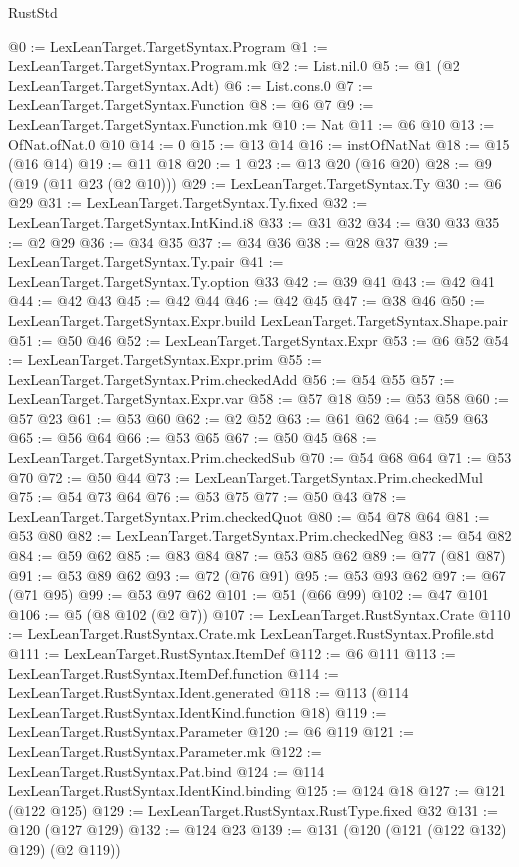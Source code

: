 \begin{lexlean}{RustStd}
\begin{coremodule}
@0 := LexLeanTarget.TargetSyntax.Program
@1 := LexLeanTarget.TargetSyntax.Program.mk
@2 := List.nil.{0}
@5 := @1 (@2 LexLeanTarget.TargetSyntax.Adt)
@6 := List.cons.{0}
@7 := LexLeanTarget.TargetSyntax.Function
@8 := @6 @7
@9 := LexLeanTarget.TargetSyntax.Function.mk
@10 := Nat
@11 := @6 @10
@13 := OfNat.ofNat.{0} @10
@14 := 0
@15 := @13 @14
@16 := instOfNatNat
@18 := @15 (@16 @14)
@19 := @11 @18
@20 := 1
@23 := @13 @20 (@16 @20)
@28 := @9 (@19 (@11 @23 (@2 @10)))
@29 := LexLeanTarget.TargetSyntax.Ty
@30 := @6 @29
@31 := LexLeanTarget.TargetSyntax.Ty.fixed
@32 := LexLeanTarget.TargetSyntax.IntKind.i8
@33 := @31 @32
@34 := @30 @33
@35 := @2 @29
@36 := @34 @35
@37 := @34 @36
@38 := @28 @37
@39 := LexLeanTarget.TargetSyntax.Ty.pair
@41 := LexLeanTarget.TargetSyntax.Ty.option @33
@42 := @39 @41
@43 := @42 @41
@44 := @42 @43
@45 := @42 @44
@46 := @42 @45
@47 := @38 @46
@50 := LexLeanTarget.TargetSyntax.Expr.build LexLeanTarget.TargetSyntax.Shape.pair
@51 := @50 @46
@52 := LexLeanTarget.TargetSyntax.Expr
@53 := @6 @52
@54 := LexLeanTarget.TargetSyntax.Expr.prim
@55 := LexLeanTarget.TargetSyntax.Prim.checkedAdd
@56 := @54 @55
@57 := LexLeanTarget.TargetSyntax.Expr.var
@58 := @57 @18
@59 := @53 @58
@60 := @57 @23
@61 := @53 @60
@62 := @2 @52
@63 := @61 @62
@64 := @59 @63
@65 := @56 @64
@66 := @53 @65
@67 := @50 @45
@68 := LexLeanTarget.TargetSyntax.Prim.checkedSub
@70 := @54 @68 @64
@71 := @53 @70
@72 := @50 @44
@73 := LexLeanTarget.TargetSyntax.Prim.checkedMul
@75 := @54 @73 @64
@76 := @53 @75
@77 := @50 @43
@78 := LexLeanTarget.TargetSyntax.Prim.checkedQuot
@80 := @54 @78 @64
@81 := @53 @80
@82 := LexLeanTarget.TargetSyntax.Prim.checkedNeg
@83 := @54 @82
@84 := @59 @62
@85 := @83 @84
@87 := @53 @85 @62
@89 := @77 (@81 @87)
@91 := @53 @89 @62
@93 := @72 (@76 @91)
@95 := @53 @93 @62
@97 := @67 (@71 @95)
@99 := @53 @97 @62
@101 := @51 (@66 @99)
@102 := @47 @101
@106 := @5 (@8 @102 (@2 @7))
@107 := LexLeanTarget.RustSyntax.Crate
@110 := LexLeanTarget.RustSyntax.Crate.mk LexLeanTarget.RustSyntax.Profile.std
@111 := LexLeanTarget.RustSyntax.ItemDef
@112 := @6 @111
@113 := LexLeanTarget.RustSyntax.ItemDef.function
@114 := LexLeanTarget.RustSyntax.Ident.generated
@118 := @113 (@114 LexLeanTarget.RustSyntax.IdentKind.function @18)
@119 := LexLeanTarget.RustSyntax.Parameter
@120 := @6 @119
@121 := LexLeanTarget.RustSyntax.Parameter.mk
@122 := LexLeanTarget.RustSyntax.Pat.bind
@124 := @114 LexLeanTarget.RustSyntax.IdentKind.binding
@125 := @124 @18
@127 := @121 (@122 @125)
@129 := LexLeanTarget.RustSyntax.RustType.fixed @32
@131 := @120 (@127 @129)
@132 := @124 @23
@139 := @131 (@120 (@121 (@122 @132) @129) (@2 @119))

\end{coremodule}
\end{lexlean}
